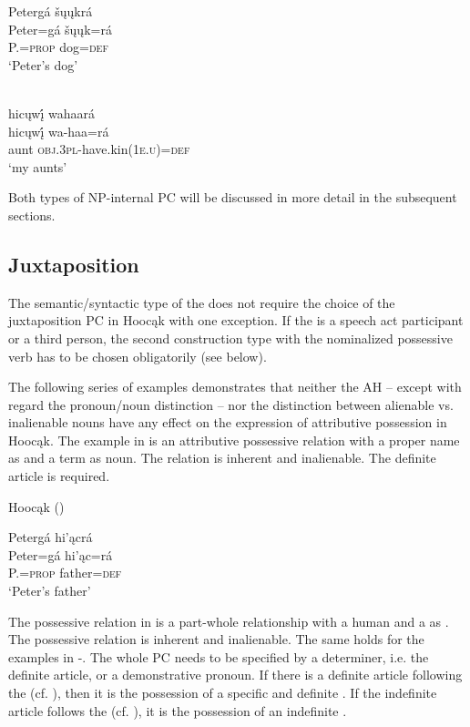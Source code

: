 \documentclass[output=paper]{LSP/langsci}
\begin{document}
\ea
\glll Petergá šųųkrá\\
Peter=gá     šųųk=rá \\
P.=\textsc{prop}    dog=\textsc{def} \\
\glt `Peter's dog'

\ex	 \label{myaunts} 
 {}{\citealt[19]{Helmbrecht2003}} \\  
\glll hicųwį́ wahaará\\
hicųwį́  wa-haa=rá \\
aunt     \textsc{obj.3pl}-have.kin(\textsc{1e.u})=\textsc{def} \\
\glt `my aunts'
\z
\z

Both types of NP-internal PC will be discussed in more detail in the subsequent sections.

\subsection{Juxtaposition}\label{sec:helmbrecht:3.1}

The semantic/syntactic type of the  does not require the choice of the juxtaposition PC in Hoocąk with one exception. If the  is a speech act participant or a third person, the second construction type with the nominalized possessive verb has to be chosen obligatorily (see  below).
 
The following series of examples demonstrates that neither the AH – except with regard the pronoun/noun distinction – nor the distinction between alienable vs. inalienable nouns have any effect on the expression of attributive possession in Hoocąk. The example in  is an attributive possessive relation with a proper name as  and a  term as  noun. The relation is inherent and inalienable. The definite article is required.
 

\ea {}Hoocąk (\citealt[16]{Helmbrecht2003}) \label{petersfather}

\glll Petergá hi'\k{a}crá\\
Peter=gá       hi'\k{a}c=rá \\
  P.=\textsc{prop} father=\textsc{def} \\
\glt`Peter's father'
\z

The possessive relation in  is a part-whole relationship with a human  and a  as . The possessive relation is inherent and inalienable. The same holds for the examples in -. The whole PC needs to be specified by a determiner, i.e. the definite article, or a demonstrative pronoun. If there is a definite article following the  (cf. ), then it is the possession of a specific and definite . If the indefinite article follows the  (cf. ), it is the possession of an indefinite . 
\end{document}
